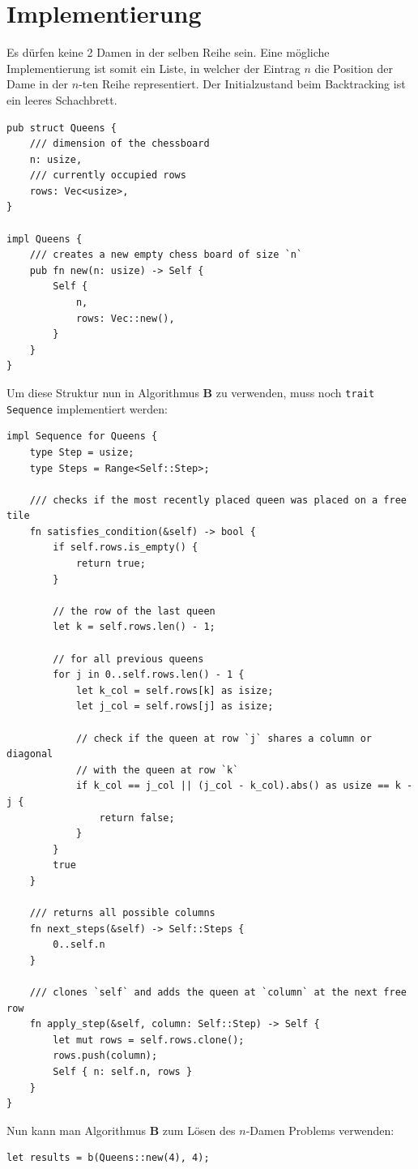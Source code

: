 \section{Implementierung}
Es dürfen keine 2 Damen in der selben Reihe sein. Eine mögliche Implementierung ist somit ein Liste, in welcher der Eintrag
$n$ die Position der Dame in der $n$-ten Reihe representiert. Der Initialzustand beim Backtracking ist ein leeres Schachbrett.
\begin{verbatim}
pub struct Queens {
    /// dimension of the chessboard
    n: usize,
    /// currently occupied rows
    rows: Vec<usize>,
}
  
impl Queens {
    /// creates a new empty chess board of size `n`
    pub fn new(n: usize) -> Self {
        Self {
            n,
            rows: Vec::new(),
        }
    }
}
\end{verbatim}
Um diese Struktur nun in Algorithmus \textbf{B} zu verwenden, muss noch \texttt{trait Sequence} implementiert werden:
\begin{verbatim}
impl Sequence for Queens {
    type Step = usize;
    type Steps = Range<Self::Step>;

    /// checks if the most recently placed queen was placed on a free tile
    fn satisfies_condition(&self) -> bool {
        if self.rows.is_empty() {
            return true;
        }

        // the row of the last queen
        let k = self.rows.len() - 1;

        // for all previous queens
        for j in 0..self.rows.len() - 1 {
            let k_col = self.rows[k] as isize;
            let j_col = self.rows[j] as isize;

            // check if the queen at row `j` shares a column or diagonal
            // with the queen at row `k`
            if k_col == j_col || (j_col - k_col).abs() as usize == k - j {
                return false;
            }
        }
        true
    }

    /// returns all possible columns
    fn next_steps(&self) -> Self::Steps {
        0..self.n
    }

    /// clones `self` and adds the queen at `column` at the next free row
    fn apply_step(&self, column: Self::Step) -> Self {
        let mut rows = self.rows.clone();
        rows.push(column);
        Self { n: self.n, rows }
    }
}
\end{verbatim}
Nun kann man Algorithmus \textbf{B} zum Lösen des $n$-Damen Problems verwenden:
\begin{verbatim}
let results = b(Queens::new(4), 4);
\end{verbatim}
